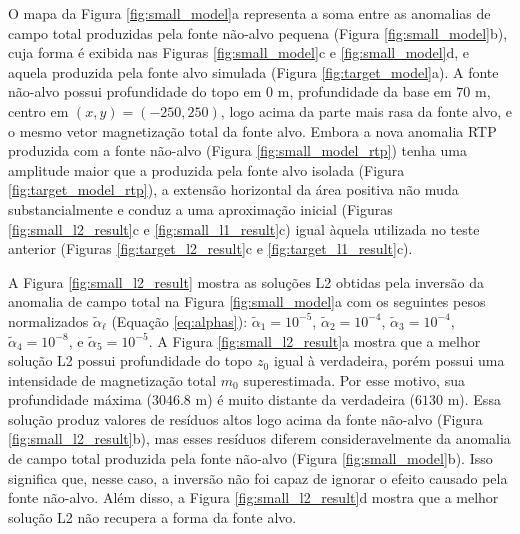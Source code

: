 O mapa da Figura \ref{fig:small_model}a representa a soma entre as anomalias de campo total produzidas pela fonte não-alvo pequena (Figura \ref{fig:small_model}b), cuja forma é exibida nas Figuras \ref{fig:small_model}c e \ref{fig:small_model}d, e aquela produzida pela fonte alvo simulada (Figura \ref{fig:target_model}a). 
A fonte não-alvo possui profundidade do topo em $0$ m, profundidade da base em $70$ m, 
centro em $(x, y) = (-250, 250)$, logo acima da parte mais rasa da fonte alvo, e o mesmo vetor magnetização total da fonte alvo.
Embora a nova anomalia RTP produzida com a fonte não-alvo (Figura 
\ref{fig:small_model_rtp}) tenha uma amplitude maior que a produzida pela fonte alvo isolada (Figura \ref{fig:target_model_rtp}), a extensão horizontal da área positiva não muda substancialmente e conduz a uma aproximação inicial
(Figuras \ref{fig:small_l2_result}c e \ref{fig:small_l1_result}c) igual àquela utilizada no teste anterior (Figuras \ref{fig:target_l2_result}c e 
\ref{fig:target_l1_result}c).

A Figura \ref{fig:small_l2_result} mostra as soluções L2 obtidas pela inversão da anomalia de campo total na Figura \ref{fig:small_model}a
com os seguintes pesos normalizados $\tilde{\alpha}_{\ell}$ (Equação \ref{eq:alphas}):
$\tilde{\alpha}_{1} = 10^{-5}$, $\tilde{\alpha}_{2} = 10^{-4}$, 
$\tilde{\alpha}_{3} = 10^{-4}$, $\tilde{\alpha}_{4} = 10^{-8}$, e 
$\tilde{\alpha}_{5} = 10^{-5}$.
A Figura \ref{fig:small_l2_result}a mostra que a melhor solução L2 possui profundidade do topo $z_{0}$ igual à verdadeira, porém possui uma intensidade de magnetização total $m_{0}$ superestimada. Por esse motivo, sua profundidade máxima 
($3046.8$ m) é muito distante da verdadeira ($6130$ m).
Essa solução produz valores de resíduos altos logo acima da fonte não-alvo 
(Figura \ref{fig:small_l2_result}b), mas esses resíduos diferem consideravelmente da anomalia de campo total produzida pela fonte não-alvo (Figura \ref{fig:small_model}b).
Isso significa que, nesse caso, a inversão não foi capaz de ignorar o efeito causado pela fonte não-alvo.
Além disso, a Figura \ref{fig:small_l2_result}d mostra que a melhor solução L2 não recupera a forma da fonte alvo.

